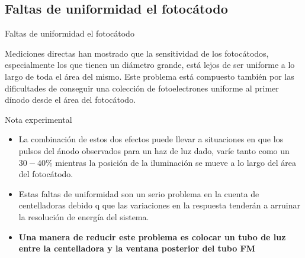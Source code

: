 \documentclass[a4paper,10pt]{beamer}
\begin{document}
\subsection{Faltas de uniformidad el fotocátodo}
\begin{frame}{Faltas de uniformidad el fotocátodo}

\begin{justify}
 
 Mediciones directas han mostrado que la sensitividad de los fotocátodos, especialmente 
 los que tienen un diámetro grande, está lejos de ser uniforme a lo largo de toda el 
 área del mismo. Este problema está compuesto también por las dificultades de conseguir 
 una colección de fotoelectrones uniforme al primer dínodo desde el área del fotocátodo.
 
 \begin{exampleblock}{Nota experimental}
  \begin{itemize}[<+->]
   \item \begin{justify}
	La combinación de estos dos efectos puede llevar a situaciones en que los pulsos 
	del ánodo observados para un haz de luz dado, varíe tanto como un $30-40\%$ mientras 
	la posición de la iluminación se mueve a lo largo del área del fotocátodo.
	 \end{justify}
   \item \begin{justify}
	Estas faltas de uniformidad son un serio problema en la cuenta de centelladoras
	debido q que las variaciones en la respuesta tenderán a arruinar la resolución 
	de energía del sistema. 
	 \end{justify}
  \item \begin{justify}
	\textbf{Una manera de reducir este problema es colocar un tubo de luz entre 
	la centelladora y la ventana posterior del tubo FM}
	 \end{justify}
  \end{itemize}
 \end{exampleblock}

\end{justify}
\end{frame}
\end{document}
